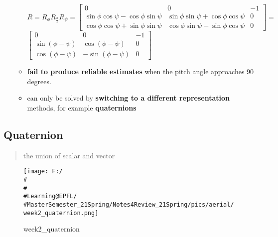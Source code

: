 \documentclass[]{article}
\begin{document}
\begin{itemize}
\begin{itemize}
    \(R=R_{\phi} R_{\frac{\pi}{2}} R_{\psi}=\left[\begin{array}{ccc}0 & 0 & -1 \\ \sin \phi \cos \psi-\cos \phi \sin \psi & \sin \phi \sin \psi+\cos \phi \cos \psi & 0 \\ \cos \phi \cos \psi+\sin \phi \sin \psi & \cos \phi \sin \psi-\sin \phi \cos \psi & 0\end{array}\right]=\)
    \(\left[\begin{array}{ccc}0 & 0 & -1 \\ \sin (\phi-\psi) & \cos (\phi-\psi) & 0 \\ \cos (\phi-\psi) & -\sin (\phi-\psi) & 0\end{array}\right]\)
  \item
    \textbf{fail to produce reliable estimates} when the pitch angle
    approaches 90 degrees.
  \item
    can only be solved by \textbf{switching to a different
    representation} methods, for example \textbf{quaternions}
  \end{itemize}
\end{itemize}

\subsection{Quaternion}\label{header-n489}

\begin{quote}
the union of scalar and vector
\end{quote}

\begin{figure}
\centering
\texttt{[image: F:/\\\#\\\#\\\#Learning@EPFL/\\\#MasterSemester\_21Spring/Notes4Review\_21Spring/pics/aerial/week2\_quaternion.png]}
\caption{week2\_quaternion}
\end{figure}
\end{document}
